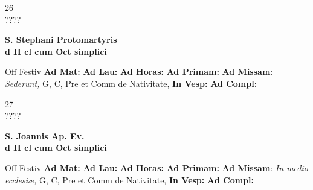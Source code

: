\documentclass[10pt, openany]{book}
\begin{document}
    \begin{center}
        \begin{minipage}{3.5in}
            \vspace{2em}
            \begin{minipage}{0.5in}
                {\Huge 26} \\
                {\normalsize ????}
            \end{minipage}
            \begin{minipage}{3.0in}
                \textbf{ \large S. Stephani Protomartyris \\
                \textnormal{\normalsize d II cl cum Oct simplici}}

            \end{minipage}
            \begin{justify}Off Festiv
                \textbf{Ad Mat: }
                \textbf{Ad Lau: }
                \textbf{Ad Horas: }
                \textbf{Ad Primam: }\textbf{Ad Missam}: \textit{Sederunt,} G, C, Pre et Comm de Nativitate, 
                \textbf{In Vesp: }
                \textbf{Ad Compl: }
            \end{justify}
        \end{minipage}
    \end{center}

    \begin{center}
        \begin{minipage}{3.5in}
            \vspace{2em}
            \begin{minipage}{0.5in}
                {\Huge 27} \\
                {\normalsize ????}
            \end{minipage}
            \begin{minipage}{3.0in}
                \textbf{ \large S. Joannis Ap. Ev. \\
                \textnormal{\normalsize d II cl cum Oct simplici}}

            \end{minipage}
            \begin{justify}Off Festiv
                \textbf{Ad Mat: }
                \textbf{Ad Lau: }
                \textbf{Ad Horas: }
                \textbf{Ad Primam: }\textbf{Ad Missam}: \textit{In medio ecclesiæ,} G, C, Pre et Comm de Nativitate, 
                \textbf{In Vesp: }
                \textbf{Ad Compl: }
            \end{justify}
        \end{minipage}
    \end{center}
\end{document}
